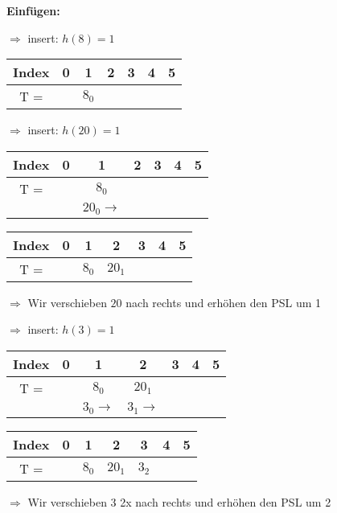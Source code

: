 \noindent
\textbf{Einfügen:}

$\Rightarrow$ insert: $h(8)=1$
\begin{center}
\begin{tabular}{|c|c|c|c|c|c|c|}
\hline
Index & 0 & 1 & 2 & 3 & 4 & 5\\
\hline
T = & & $8_0$ & & & &\\
\hline
\end{tabular}
\end{center}

$\Rightarrow$ insert: $h(20)=1$
\begin{multicols}{2}
\begin{center}
\begin{tabular}{|c|c|c|c|c|c|c|}
\hline
Index & 0 & 1 & 2 & 3 & 4 & 5\\
\hline
T = & & $8_0$ & & & &\\
\hline
& & $20_0 \rightarrow$ & & & &\\
\hline
\end{tabular}
\end{center}


\columnbreak
\begin{center}
\begin{tabular}{|c|c|c|c|c|c|c|}
\hline
Index & 0 & 1 & 2 & 3 & 4 & 5\\
\hline
T = & & $8_0$ & $20_1$ & & &\\
\hline
\end{tabular}
\end{center}
$\Rightarrow$ Wir verschieben $20$ nach rechts und erhöhen den PSL um 1
\end{multicols}

$\Rightarrow$ insert: $h(3)=1$
\begin{multicols}{2}
\begin{center}
\begin{tabular}{|c|c|c|c|c|c|c|}
\hline
Index & 0 & 1 & 2 & 3 & 4 & 5\\
\hline
T = & & $8_0$ & $20_1$ & & &\\
\hline
& & $3_0 \rightarrow$ & $3_1 \rightarrow$& & &\\
\hline
\end{tabular}
\end{center}


\columnbreak
\begin{center}
\begin{tabular}{|c|c|c|c|c|c|c|}
\hline
Index & 0 & 1 & 2 & 3 & 4 & 5\\
\hline
T = & & $8_0$ & $20_1$ & $3_2$ & &\\
\hline
\end{tabular}
\end{center}
$\Rightarrow$ Wir verschieben $3$ 2x nach rechts und erhöhen den PSL um 2
\end{multicols}



